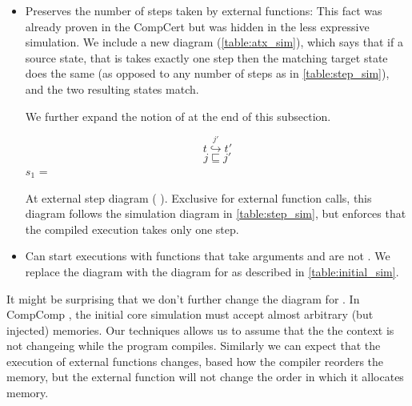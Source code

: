 \begin{itemize}
\item Preserves the number of steps taken by external functions: This fact was already proven in the CompCert but was hidden in the less expressive simulation. We include a new diagram (\ref{table:atx_sim}),  which says that if a source state, that is  takes exactly one step then the matching target state does the same (as opposed to any number of steps as in  \ref{table:step_sim}), and the two resulting states match. 

We further expand the notion of  at the end of this subsection.

\begin{table}\centering\begin{multicols}{2}

$$t \overset{j'}{\hookrightarrow} t'$$
$$j \sqsubseteq j'$$
 $s_1$ = 
\end{multicols}

\caption{At external step diagram ( ). Exclusive for external function calls, this diagram follows the simulation diagram in \ref{table:step_sim}, but enforces that the compiled execution takes only one step. }\label{table:atx_sim}
\end{table}

\item Can start executions with functions that take arguments and are not . We replace the  diagram with  the diagram for  as described in \ref{table:initial_sim}.

\end{itemize}

It might be surprising that we don't further change the diagram for . In CompComp \cite{compcomp}, the initial core simulation must accept almost arbitrary (but injected) memories. Our techniques allows us to assume that the the context is not changeing while the program compiles. Similarly we can expect that the execution of external functions changes, based how the compiler reorders the memory, but the external function will not change the order in which it allocates memory.

